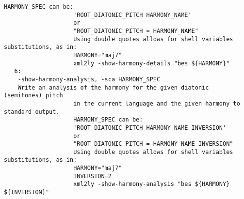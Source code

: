\begin{lstlisting}[language=Terminal]
                    HARMONY_SPEC can be:
                    'ROOT_DIATONIC_PITCH HARMONY_NAME'
                    or
                    "ROOT_DIATONIC_PITCH = HARMONY_NAME"
                    Using double quotes allows for shell variables substitutions, as in:
                    HARMONY="maj7"
                    xml2ly -show-harmony-details "bes ${HARMONY}"
   6:
    -show-harmony-analysis, -sca HARMONY_SPEC
    Write an analysis of the harmony for the given diatonic (semitones) pitch
                    in the current language and the given harmony to standard output.
                    HARMONY_SPEC can be:
                    'ROOT_DIATONIC_PITCH HARMONY_NAME INVERSION'
                    or
                    "ROOT_DIATONIC_PITCH = HARMONY_NAME INVERSION"
                    Using double quotes allows for shell variables substitutions, as in:
                    HARMONY="maj7"
                    INVERSION=2
                    xml2ly -show-harmony-analysis "bes ${HARMONY} ${INVERSION}"
\end{lstlisting}
